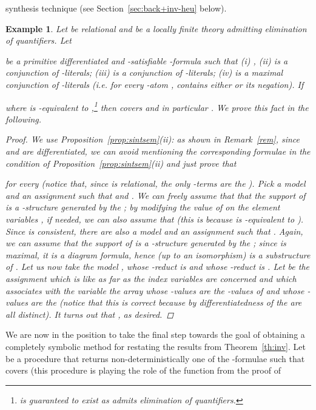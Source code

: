 \documentclass{LMCS}
\theoremstyle{plain}\newtheorem{assumption}[thm]{Assumption}
\theoremstyle{plain}\newtheorem{proposition}[thm]{Proposition}
\theoremstyle{plain}\newtheorem{property}[thm]{Property}
\theoremstyle{plain}\newtheorem{example}[thm]{Example}
\theoremstyle{plain}\newtheorem{claim}[thm]{Claim}
\theoremstyle{plain}\newtheorem{lemma}[thm]{Lemma}
\begin{document}
synthesis technique (see Section~\ref{sec:back+inv-heu} below).
\begin{example}\em
  \label{ex:cover}
  Let  be relational and  be a locally finite theory
  admitting elimination of quantifiers.  Let
  
  be a primitive differentiated and -satisfiable
  -formula such that (i) , (ii)
   is a conjunction of -literals; (iii)
   is a conjunction of -literals; (iv)
   is a maximal conjunction of -literals
  (i.e. for every -atom ,  contains
  either  or its negation).  If
  
  where  is -equivalent to ,\footnote{ is guaranteed to exist as 
    admits elimination of quantifiers.} then  covers  and in
  particular .  We prove this fact in the following.
  \begin{proof}
    We use Proposition~\ref{prop:sintsem}(ii): as shown in
    Remark~\ref{rem}, since  and  are differentiated, we can
    avoid mentioning the corresponding formulae  in the condition
    of Proposition~\ref{prop:sintsem}(ii) and just prove that
    
    for every  (notice that, since  is relational,
    the only -terms are the ).  Pick a model 
    and an assignment  such that  and . We can freely assume
    that that the support of  is a -structure
    generated by the ; by modifying the value of
     on the element variables , if needed, we can
    also assume that 
    (this is because  is -equivalent to ). Since  is consistent, there are also
    a model  and an assignment  such that . Again, we can assume that the support of
     is a -structure generated by the
    ; since  is maximal, it is a
    diagram formula, hence (up to an isomorphism)  is a
    substructure of . Let us now take the model , whose
    -reduct is  and whose -reduct is
    . Let  be the assignment which is like
     as far as the index variables  are
    concerned and which associates with the variable  the array
    whose -values are the
    -values of  and
    whose -values are the  (notice that this is
    correct because by differentiatedness of  the
     are all distinct). It turns out that , as
    desired.
\end{proof}
\end{example}
We are now in the position to take the final step towards the goal of
obtaining a completely symbolic method for
restating
the results from Theorem~\ref{th:inv}.  Let 
be a procedure that returns non-deterministically one of the
-formulae  such that  covers  (this procedure is
playing the role of the function  from the proof of
\end{document}
